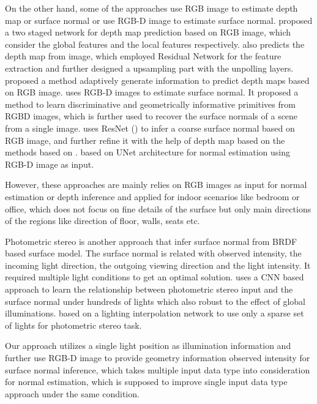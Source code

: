 On the other hand, some of the approaches use RGB image to estimate depth map or surface normal or use RGB-D image to estimate surface normal. 
\cite{Eigen} proposed a two staged network for depth map prediction based on RGB image, which consider the global features and the local features respectively. \cite{img2depth} also predicts the depth map from image, which employed Residual Network for the feature extraction and further designed a upsampling part with the unpolling layers. 
\cite{binsformer} proposed a method adaptively generate information to predict depth maps based on RGB image. 
\cite{geometry_based_solution} uses RGB-D images to estimate surface normal. It proposed a method to learn discriminative and geometrically informative primitives from RGBD images, which is further used to recover the surface normals of a scene from a single image. 
\cite{GeoNet} uses ResNet (\cite{resnet}) to infer a coarse surface normal based on RGB image, and further refine it with the help of depth map based on the methods based on \cite{geometry_based_solution}. 
\cite{hfm} based on UNet architecture for normal estimation using RGB-D image as input. 

However, these approaches are mainly relies on RGB images as input for normal estimation or depth inference and applied for indoor scenarios like bedroom or office, which does not focus on fine details of the surface but only main directions of the regions like direction of floor, walls, seats etc.


Photometric stereo is another approach that infer surface normal from BRDF based surface model. The surface normal is related with observed intensity, the incoming light direction, the outgoing viewing direction and the light intensity. It required multiple light conditions to get an optimal solution. \cite{CNN-PS} uses a CNN based approach to learn  the relationship between photometric stereo input and the surface normal under hundreds of lights which also robust to the effect of global illuminations. \cite{spline-net} based on a lighting interpolation network to use only  a sparse set of lights for photometric stereo task.


Our approach utilizes a single light position as illumination information and further use RGB-D image to provide geometry information observed intensity for surface normal inference, which takes multiple input data type into consideration for normal estimation, which is supposed to improve single input data type approach under the same condition.






